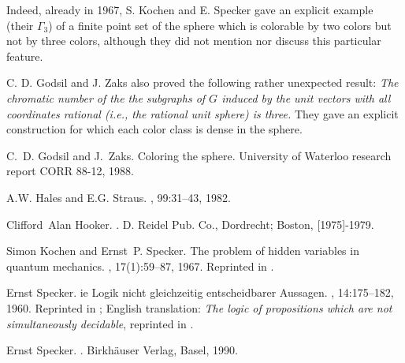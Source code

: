 Indeed, already in 1967, S. Kochen and E. Specker \cite{kochen1}
gave an explicit example (their $\Gamma_3$)
of a finite point set
of the sphere which is colorable by two colors but not by three colors,
although they did not mention nor discuss this particular
feature.

C. D. Godsil and J. Zaks \cite{godsil-zaks} also proved the following
rather unexpected result: {\em The chromatic number of the
 the subgraphs of $G$ induced by the unit
vectors with all coordinates rational (i.e., the {\em rational} unit sphere) is three.}
They gave an explicit construction for which each color class is dense in the sphere.




%
%
%


\begin{thebibliography}{1}

C.~D. Godsil and J.~Zaks.
\newblock Coloring the sphere.
\newblock University of Waterloo research report CORR 88-12, 1988.

A.W. Hales and E.G. Straus.
, 99:31--43, 1982.

Clifford~Alan Hooker.
.
\newblock D. Reidel Pub. Co., Dordrecht; Boston, [1975]-1979.

Simon Kochen and Ernst~P. Specker.
\newblock The problem of hidden variables in quantum mechanics.
, 17(1):59--87, 1967.
\newblock Reprinted in \cite[pp. 235--263]{specker-ges}.

Ernst Specker.
ie {L}ogik nicht gleichzeitig entscheidbarer {A}ussagen.
, 14:175--182, 1960.
\newblock Reprinted in \cite[pp. 175--182]{specker-ges}; English translation:
  {\it The logic of propositions which are not simultaneously decidable},
  reprinted in \cite[pp. 135-140]{hooker}.

Ernst Specker.
.
\newblock Birkh{\"{a}}user Verlag, Basel, 1990.

\end{thebibliography}



